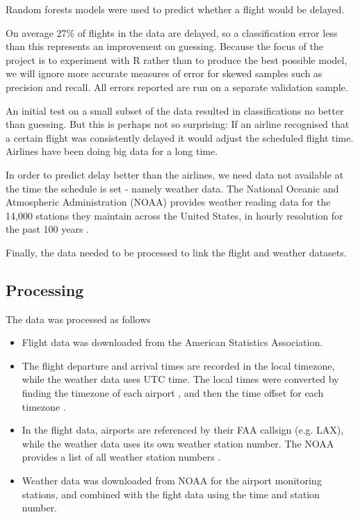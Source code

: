 \documentclass{article}
\begin{document}
Random forests models were used to predict whether a flight would be delayed.

On average 27\% of flights in the data are delayed, so a classification error less than this represents an improvement on guessing. Because the focus of the project is to experiment with R rather than to produce the best possible model, we will ignore more accurate measures of error for skewed samples such as precision and recall. All errors reported are run on a separate validation sample.

An initial test on a small subset of the data resulted in classifications no better than guessing. But this is perhaps not so surprising: If an airline recognised that a certain flight was consistently delayed it would adjust the scheduled flight time. Airlines have been doing big data for a long time.

In order to predict delay better than the airlines, we need data not available at the time the schedule is set - namely weather data. The National Oceanic and Atmospheric Administration (NOAA) provides weather reading data for the 14,000 stations they maintain across the United States, in hourly resolution for the past 100 years \cite{noaa}.

Finally, the data needed to be processed to link the flight and weather datasets.

\subsection{Processing}

The data was processed as follows
\begin{itemize}
    \item Flight data was downloaded from the American Statistics Association.
    \item The flight departure and arrival times are recorded in the local timezone, while the weather data uses UTC time. The local times were converted by finding the timezone of each airport \cite{tzmap}, and then the time offset for each timezone \cite{wikitz}.
    \item In the flight data, airports are referenced by their FAA callsign (e.g. LAX), while the weather data uses its own weather station number. The NOAA provides a list of all weather station numbers \cite{wban}.
    \item Weather data was downloaded from NOAA for the airport monitoring stations, and combined with the fight data using the time and station number.
\end{itemize}
\end{document}
